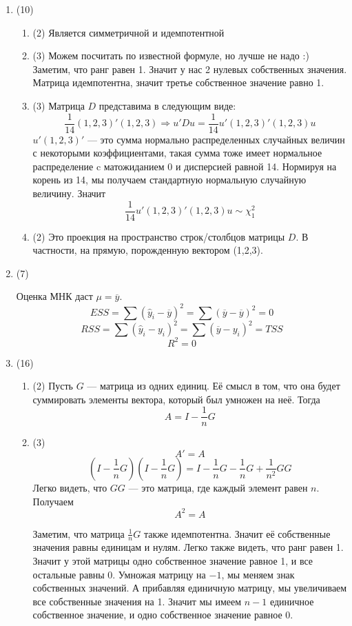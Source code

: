 \documentclass[12pt, a4paper]{article}
\theoremstyle{definition}
\begin{document}
\begin{enumerate}
\item (10)
\begin{enumerate}
  \item (2)
  Является симметричной и идемпотентной
  \item (3)
Можем посчитать по известной формуле, но лучше не надо :) Заметим, что ранг равен 1. Значит у нас 2 нулевых собственных значения. Матрица идемпотентна, значит третье собственное значение равно 1.
  \item (3)
Матрица $D$ представима в следующим виде:
\[
\frac{1}{14} (1, 2, 3)' (1,2,3) \Rightarrow u'Du = \frac{1}{14} u'(1, 2, 3)' (1,2,3)u
\]
$u'(1, 2,3)' $ — это сумма нормально распределенных случайных величин с некоторыми коэффициентами, такая сумма тоже имеет нормальное распределение c матожиданием 0 и дисперсией равной 14. Нормируя на корень из 14, мы получаем стандартную нормальную случайную величину. Значит
\[
\frac{1}{14} u'(1, 2, 3)' (1,2,3)u \sim \chi_1^2
\]

  \item (2)
Это проекция на пространство строк/столбцов матрицы $D$. В частности, на прямую, порожденную вектором (1,2,3).
\end{enumerate}

\item (7)

Оценка МНК даст $\mu = \overline{y}$.
\[
ESS = \sum (\hat{y}_i - \overline{y})^2 = \sum (\overline{y}- \overline{y})^2 = 0
\]
\[
RSS =  \sum (\hat{y}_i - y_i)^2 =  \sum (\overline{y} - y_i)^2  = TSS
\]
\[
R^2 = 0
\]

\item (16)
\begin{enumerate}
\item (2)
Пусть $G$ — матрица из одних единиц. Её смысл в том, что она будет суммировать элементы вектора, который был умножен на неё. Тогда
\[
A = I - \frac{1}{n}G
\]
\item (3)
\[
A' = A
\]
\[
(I - \frac{1}{n}G)(I - \frac{1}{n}G) = I -  \frac{1}{n}G - \frac{1}{n}G + \frac{1}{n^2}GG
\]
Легко видеть, что $GG$ — это матрица, где каждый элемент равен $n$. Получаем
\[
A^2 = A
\]

Заметим, что матрица $\frac{1}{n}G$ также идемпотентна. Значит её собственные значения равны единицам и нулям. Легко также видеть, что ранг равен 1. Значит у этой матрицы одно собственное значение равное 1, и все остальные равны 0. Умножая матрицу на $-1$, мы меняем знак собственных значений. А прибавляя единичную матрицу, мы увеличиваем все собственные значения на 1. Значит мы имеем $n-1$ единичное собственное значение, и одно собственное значение равное 0.


\end{enumerate}
\end{enumerate}
\end{document}
